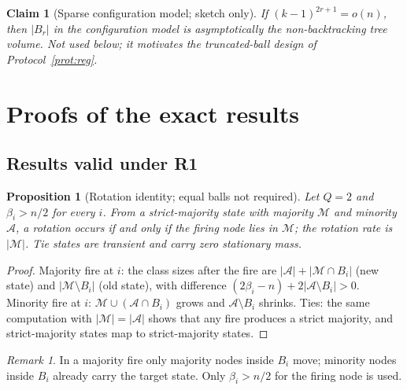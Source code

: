 \documentclass[aps,pre,onecolumn,superscriptaddress,amsmath,amssymb,longbibliography]{revtex4-2}
\newtheorem{proposition}[theorem]{Proposition}
\newtheorem{claim}[theorem]{Claim}
\theoremstyle{definition}
\theoremstyle{remark}
\newtheorem{remark}[theorem]{Remark}
\begin{document}
\begin{claim}[Sparse configuration model; sketch only]
\label{cl:B5}
If $(k-1)^{2r+1}=o(n)$, then $|B_r|$ in the configuration model is
asymptotically the non-backtracking tree volume. Not used below; it
motivates the truncated-ball design of Protocol~\ref{prot:reg}.
\end{claim}

\section{Proofs of the exact results}
\label{sec:S4}

\subsection{Results valid under R1}

\begin{proposition}[Rotation identity; equal balls not required]
\label{prop:rot}
Let $Q=2$ and $\beta_i>n/2$ for every $i$. From a strict-majority state
with majority $\mathcal M$ and minority $\mathcal A$, a rotation occurs
if and only if the firing node lies in $\mathcal M$; the rotation rate is
$|\mathcal M|$. Tie states are transient and carry zero stationary mass.
\end{proposition}
\begin{proof}
Majority fire at $i$: the class sizes after the fire are
$|\mathcal A|+|\mathcal M\cap B_i|$ (new state) and
$|\mathcal M\setminus B_i|$ (old state), with difference
$(2\beta_i-n)+2|\mathcal A\setminus B_i|>0$. Minority fire at $i$:
$\mathcal M\cup(\mathcal A\cap B_i)$ grows and $\mathcal A\setminus B_i$
shrinks. Ties: the same computation with $|\mathcal M|=|\mathcal A|$
shows that any fire produces a strict majority, and strict-majority
states map to strict-majority states.
\end{proof}

\begin{remark}
\label{rem:onlymaj}
In a majority fire only majority nodes inside $B_i$ move; minority nodes
inside $B_i$ already carry the target state. Only $\beta_i>n/2$ for the
firing node is used.
\end{remark}
\end{document}
